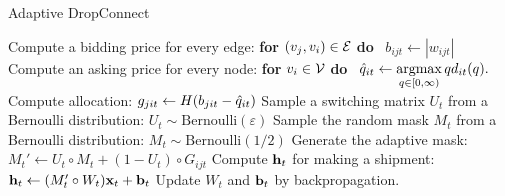 \begin{algorithm}[t]
\caption{Adaptive DropConnect}
\begin{algorithmic}[1]
		\STATE Compute a bidding price for every edge: \textbf{for} $(v_j, v_i) \in \mathcal{E}$ \textbf{do} \
		$b_{ijt} \leftarrow |w_{ijt}|$ 
		\STATE Compute an asking price for every node: \textbf{for} $v_{i} \in \mathcal{V}$ \textbf{do} \
		${\hat{q}}_{it} \leftarrow \mathop{\rm argmax}\limits_{q \in [0, \infty)} q d_{it}(q).$
		\FOR{$(v_i, v_j) \in \edges$}
				\STATE Compute allocation: $g_{jit} \leftarrow H(b_{jit} - {\hat{q}}_{it})$ 
		\ENDFOR
		\STATE Sample a switching matrix $U_t$ from a Bernoulli distribution: $U_t \sim \mathrm{Bernoulli}(\varepsilon)$
		\STATE Sample the random mask $M_t$ from a Bernoulli distribution: $M_t \sim \mathrm{Bernoulli}(1/2)$
		\STATE Generate the adaptive mask: $M_t' \leftarrow U_t \circ M_t + (1 - U_t) \circ G_{ijt}$ 
		\STATE Compute $\mathrm{\mathbf{h}}_t$ for making a shipment:
			$\mathrm{\mathbf{h}}_t \leftarrow (M_t' \circ W_t) \mathrm{\mathbf{x}}_t + \mathrm{\mathbf{b}}_t$
		\STATE Update $W_t$ and $\mathrm{\mathbf{b}}_t$ by backpropagation.
	\ENDFOR
\end{algorithmic}
\end{algorithm}



%
%
%

